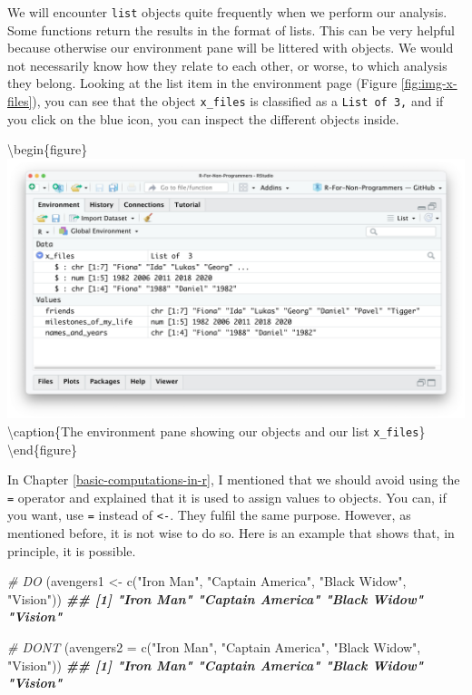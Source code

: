 \documentclass[
]{book}
\newenvironment{Shaded}{\begin{snugshade}}{\end{snugshade}}
\newcommand{\AttributeTok}[1]{\textcolor[rgb]{0.77,0.63,0.00}{#1}}
\newcommand{\CommentTok}[1]{\textcolor[rgb]{0.56,0.35,0.01}{\textit{#1}}}
\newcommand{\DocumentationTok}[1]{\textcolor[rgb]{0.56,0.35,0.01}{\textbf{\textit{#1}}}}
\newcommand{\FunctionTok}[1]{\textcolor[rgb]{0.00,0.00,0.00}{#1}}
\newcommand{\NormalTok}[1]{#1}
\newcommand{\OtherTok}[1]{\textcolor[rgb]{0.56,0.35,0.01}{#1}}
\newcommand{\StringTok}[1]{\textcolor[rgb]{0.31,0.60,0.02}{#1}}
\begin{document}
We will encounter \texttt{list} objects quite frequently when we perform our analysis. Some functions return the results in the format of lists. This can be very helpful because otherwise our environment pane will be littered with objects. We would not necessarily know how they relate to each other, or worse, to which analysis they belong. Looking at the list item in the environment page (Figure \ref{fig:img-x-files}), you can see that the object \texttt{x\_files} is classified as a \texttt{List\ of\ 3,} and if you click on the blue icon, you can inspect the different objects inside.

\textbackslash begin\{figure\}
\includegraphics[width=38.67in]{images/chapter_05_img/02_basic_computation_environment_lists} \textbackslash caption\{The environment pane showing our objects and our list \texttt{x\_files}\}\label{fig:img-x-files}
\textbackslash end\{figure\}

In Chapter \ref{basic-computations-in-r}, I mentioned that we should avoid using the \texttt{=} operator and explained that it is used to assign values to objects. You can, if you want, use \texttt{=} instead of \texttt{\textless{}-}. They fulfil the same purpose. However, as mentioned before, it is not wise to do so. Here is an example that shows that, in principle, it is possible.

\begin{Shaded}
\begin{Highlighting}[]
\CommentTok{\# DO}
\NormalTok{(avengers1 }\OtherTok{\textless{}{-}} \FunctionTok{c}\NormalTok{(}\StringTok{"Iron Man"}\NormalTok{, }\StringTok{"Captain America"}\NormalTok{, }\StringTok{"Black Widow"}\NormalTok{, }\StringTok{"Vision"}\NormalTok{))}
\DocumentationTok{\#\# [1] "Iron Man"        "Captain America" "Black Widow"     "Vision"}

\CommentTok{\# DON\textquotesingle{}T}
\NormalTok{(}\AttributeTok{avengers2 =} \FunctionTok{c}\NormalTok{(}\StringTok{"Iron Man"}\NormalTok{, }\StringTok{"Captain America"}\NormalTok{, }\StringTok{"Black Widow"}\NormalTok{, }\StringTok{"Vision"}\NormalTok{))}
\DocumentationTok{\#\# [1] "Iron Man"        "Captain America" "Black Widow"     "Vision"}
\end{Highlighting}
\end{Shaded}
\end{document}
